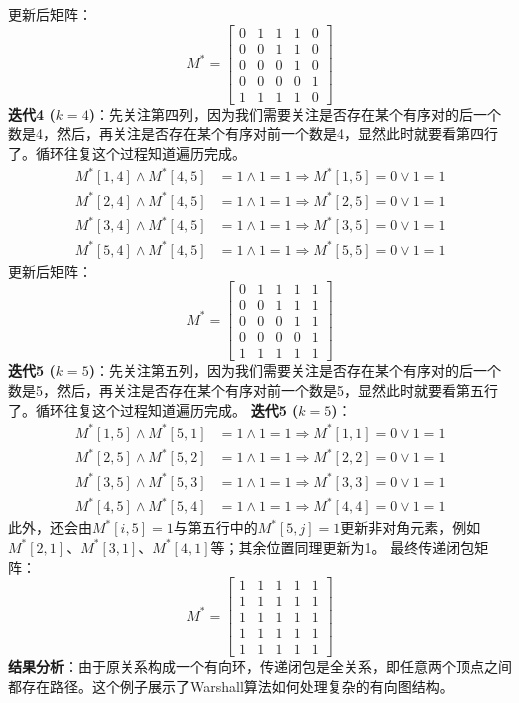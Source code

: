 \documentclass[lang=cn,11pt]{elegantbook}
\begin{document}
更新后矩阵：
\[
M^* = \begin{bmatrix}
0 & 1 & 1 & 1 & 0 \\
0 & 0 & 1 & 1 & 0 \\
0 & 0 & 0 & 1 & 0 \\
0 & 0 & 0 & 0 & 1 \\
1 & 1 & 1 & 1 & 0
\end{bmatrix}
\]
\textbf{迭代4 ($k=4$)}：先关注第四列，因为我们需要关注是否存在某个有序对的后一个数是4，然后，再关注是否存在某个有序对前一个数是4，显然此时就要看第四行了。循环往复这个过程知道遍历完成。
\begin{align*}
M^*[1,4] \land M^*[4,5] &= 1 \land 1 = 1 \Rightarrow M^*[1,5] = 0 \lor 1 = 1 \\
M^*[2,4] \land M^*[4,5] &= 1 \land 1 = 1 \Rightarrow M^*[2,5] = 0 \lor 1 = 1 \\
M^*[3,4] \land M^*[4,5] &= 1 \land 1 = 1 \Rightarrow M^*[3,5] = 0 \lor 1 = 1 \\
M^*[5,4] \land M^*[4,5] &= 1 \land 1 = 1 \Rightarrow M^*[5,5] = 0 \lor 1 = 1
\end{align*}
更新后矩阵：
\[
M^* = \begin{bmatrix}
0 & 1 & 1 & 1 & 1 \\
0 & 0 & 1 & 1 & 1 \\
0 & 0 & 0 & 1 & 1 \\
0 & 0 & 0 & 0 & 1 \\
1 & 1 & 1 & 1 & 1
\end{bmatrix}
\]
\textbf{迭代5 ($k=5$)}：先关注第五列，因为我们需要关注是否存在某个有序对的后一个数是5，然后，再关注是否存在某个有序对前一个数是5，显然此时就要看第五行了。循环往复这个过程知道遍历完成。
\textbf{迭代5 ($k=5$)}：
\begin{align*}
M^*[1,5] \land M^*[5,1] &= 1 \land 1 = 1 \Rightarrow M^*[1,1] = 0 \lor 1 = 1 \\
M^*[2,5] \land M^*[5,2] &= 1 \land 1 = 1 \Rightarrow M^*[2,2] = 0 \lor 1 = 1 \\
M^*[3,5] \land M^*[5,3] &= 1 \land 1 = 1 \Rightarrow M^*[3,3] = 0 \lor 1 = 1 \\
M^*[4,5] \land M^*[5,4] &= 1 \land 1 = 1 \Rightarrow M^*[4,4] = 0 \lor 1 = 1
\end{align*}
此外，还会由$M^*[i,5]=1$与第五行中的$M^*[5,j]=1$更新非对角元素，例如$M^*[2,1]$、$M^*[3,1]$、$M^*[4,1]$等；其余位置同理更新为1。
最终传递闭包矩阵：
\[
M^* = \begin{bmatrix}
1 & 1 & 1 & 1 & 1 \\
1 & 1 & 1 & 1 & 1 \\
1 & 1 & 1 & 1 & 1 \\
1 & 1 & 1 & 1 & 1 \\
1 & 1 & 1 & 1 & 1
\end{bmatrix}
\]
\textbf{结果分析}：由于原关系构成一个有向环，传递闭包是全关系，即任意两个顶点之间都存在路径。这个例子展示了Warshall算法如何处理复杂的有向图结构。
\end{document}
